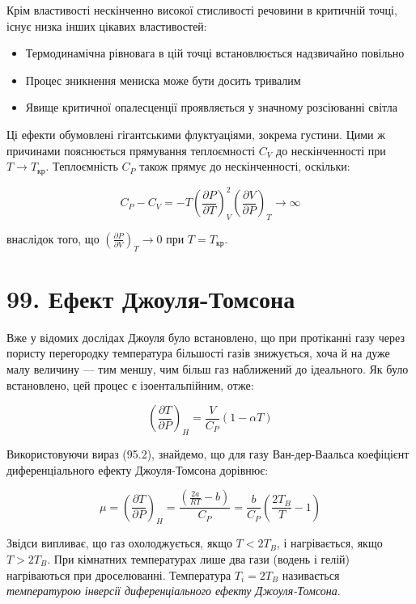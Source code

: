 \documentclass{article}
\begin{document}
Крім властивості нескінченно високої стисливості речовини в критичній точці, існує низка інших цікавих
властивостей:
\begin{itemize}
\item Термодинамічна рівновага в цій точці встановлюється надзвичайно повільно
\item Процес зникнення мениска може бути досить тривалим
\item Явище критичної опалесценції проявляється у значному розсіюванні світла
\end{itemize}

Ці ефекти обумовлені гігантськими флуктуаціями, зокрема густини. Цими ж причинами пояснюється
прямування теплоємності $C_V$ до нескінченності при $T \to T_{\text{кр}}$. Теплоємність $C_P$ також
прямує до нескінченності, оскільки:

\begin{equation}
C_P - C_V = -T\left(\frac{\partial P}{\partial T}\right)_V^2 \left(\frac{\partial V}{\partial
P}\right)_T \to \infty
\end{equation}

внаслідок того, що $\left(\frac{\partial P}{\partial V}\right)_T \to 0$ при $T = T_{\text{кр}}$.

\section*{99. Ефект Джоуля-Томсона}

Вже у відомих дослідах Джоуля було встановлено, що при протіканні газу через пористу перегородку
температура більшості газів знижується, хоча й на дуже малу величину — тим меншу, чим більш газ
наближений до ідеального. Як було встановлено, цей процес є ізоентальпійним, отже:

\begin{equation}
\left(\frac{\partial T}{\partial P}\right)_H = \frac{V}{C_P}(1 - \alpha T)
\label{eq:99.1}
\end{equation}

Використовуючи вираз (95.2), знайдемо, що для газу Ван-дер-Ваальса коефіцієнт диференціального ефекту
Джоуля-Томсона дорівнює:

\begin{equation}
\mu = \left(\frac{\partial T}{\partial P}\right)_H = \frac{\left(\frac{2a}{RT} - b\right)}{C_P} =
\frac{b}{C_P}\left(\frac{2T_B}{T} - 1\right)
\label{eq:99.2}
\end{equation}

Звідси випливає, що газ охолоджується, якщо $T < 2T_B$, і нагрівається, якщо $T > 2T_B$. При кімнатних
температурах лише два гази (водень і гелій) нагріваються при дроселюванні. Температура $T_i = 2T_B$
називається \emph{температурою інверсії диференціального ефекту Джоуля-Томсона}.
\end{document}

